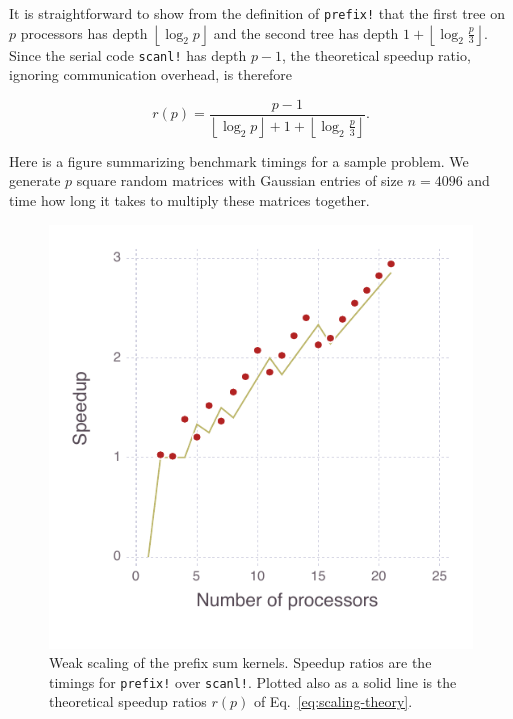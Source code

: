 \documentclass{sig-alternate}
\newcommand{\code}[1]{\texttt{#1}}
\newcommand{\floor}[1]{\left\lfloor #1 \right\rfloor}
\begin{document}
It is straightforward to show from the definition of \code{prefix!} that the first tree on $p$ processors has depth $\floor{\log_2 p}$ and the second tree has depth $1 + \floor{\log_2 \frac p 3}$. Since the serial code \code{scanl!} has depth $p-1$, the theoretical speedup ratio, ignoring communication overhead, is therefore

\begin{equation}
    r (p) = \frac {p-1} {\floor{\log_2 p} + 1 + \floor{\log_2 \frac p 3}}.
    \label{eq:scaling-theory}
\end{equation}

Here is a figure summarizing benchmark timings for a sample problem. We generate $p$ square random matrices with Gaussian entries of size $n = 4096$ and time how long it takes to multiply these matrices together.

\begin{figure}
  \centering
  \includegraphics{scaling}
  \caption{Weak scaling of the prefix sum kernels. Speedup ratios are the timings for \code{prefix!} over \code{scanl!}. Plotted also as a solid line is the theoretical speedup ratios $r(p)$ of Eq.~\ref{eq:scaling-theory}.}
  \label{fig:scaling}
\end{figure}
\end{document}
